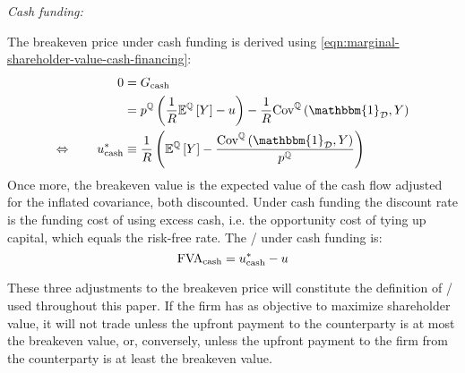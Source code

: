 \documentclass[main.tex]{subfiles}
\begin{document}
            \noindent
            \textit{Cash funding:} \par
            The breakeven price under cash funding is derived using
            \cref{eqn:marginal-shareholder-value-cash-financing}:
                \begin{align}
                    0 &= G_{\text{cash}} 
                        \nonumber \\
                    &=
                        p^{\mathbb{Q}} \left(
                            \discountfactor
                            \mathbb{E}^{\mathbb{Q}}\left[Y\right]
                            - u
                        \right)
                        -
                        \discountfactor
                        \text{Cov}^{\mathbb{Q}}\left(\mathbbm{1}_{\mathcal{D}}, Y\right) 
                        \nonumber \\
                    \Leftrightarrow \qquad
                    u_{\text{cash}}^{\ast}
                    &\equiv
                        \discountfactor
                        \left(
                            \mathbb{E}^{\mathbb{Q}}\left[Y\right]
                            -
                            \frac{
                                \text{Cov}^{\mathbb{Q}}\left(\mathbbm{1}_{\mathcal{D}}, Y\right)
                            }{
                                p^{\mathbb{Q}}  
                            }  
                        \right)
                    \label{eqn:shareholdes-breakeven-cash-financing}
                \end{align}
            Once more, the breakeven value is the expected value of the cash flow
            adjusted for the inflated covariance, both discounted. 
            Under cash funding the discount rate is the funding cost of using excess cash,
            i.e. the opportunity cost of tying up capital, which equals the risk-free rate.
            The \FVA/ under cash funding is:
                \begin{equation}
                    \FVA/_{\text{cash}} 
                        = u^{\ast}_{\text{cash}} - u
                    \label{eqn:fva-cash-financing}
                \end{equation}

        These three adjustments to the breakeven price 
        will constitute the definition of \FVA/ used throughout this paper.
        If the firm has as objective to maximize shareholder value, 
        it will not trade unless the upfront payment to the counterparty is at most the breakeven value,
        or, conversely, unless the upfront payment to the firm from the counterparty is at least the breakeven value.
\end{document}

